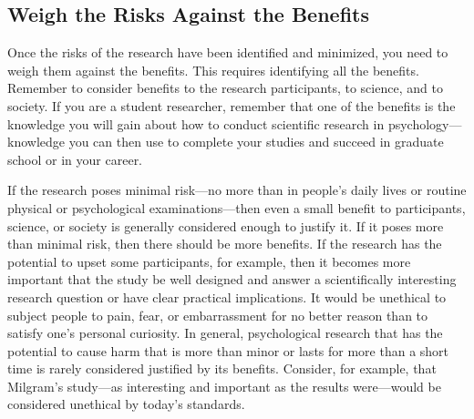 \subsection{Weigh the Risks Against the Benefits}
Once the risks of the research have been identified and minimized, you need to weigh them against the benefits. This requires identifying all the benefits. Remember to consider benefits to the research participants, to science, and to society. If you are a student researcher, remember that one of the benefits is the knowledge you will gain about how to conduct scientific research in psychology---knowledge you can then use to complete your studies and succeed in graduate school or in your career.

If the research poses minimal risk---no more than in people's daily lives or routine physical or psychological examinations---then even a small benefit to participants, science, or society is generally considered enough to justify it. If it poses more than minimal risk, then there should be more benefits. If the research has the potential to upset some participants, for example, then it becomes more important that the study be well designed and answer a scientifically interesting research question or have clear practical implications. It would be unethical to subject people to pain, fear, or embarrassment for no better reason than to satisfy one's personal curiosity. In general, psychological research that has the potential to cause harm that is more than minor or lasts for more than a short time is rarely considered justified by its benefits. Consider, for example, that Milgram's study---as interesting and important as the results were---would be considered unethical by today's standards.


